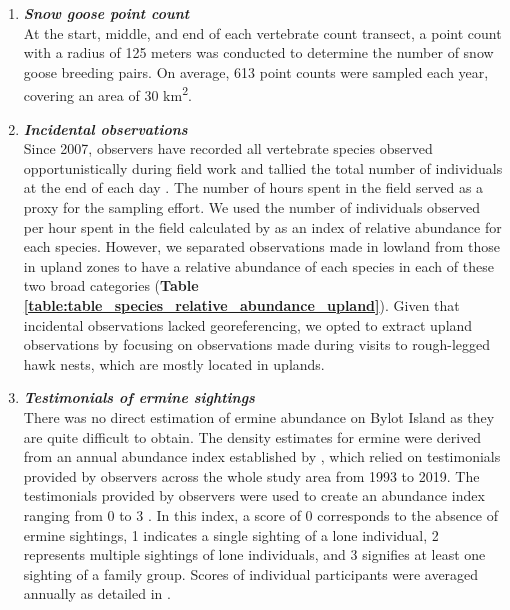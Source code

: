 \documentclass[a4paper,twoside,12pt]{article}
\begin{document}
\begin{enumerate}[label=\roman*]
\begin{figure}
\end{figure}
\newpage
\item[] \textit{\textbf{Snow goose point count}}\\
At the start, middle, and end of each vertebrate count transect, a point count with a radius of 125 meters was conducted to determine the number of snow goose breeding pairs. On average, 613  point counts were sampled each year, covering an area of 30  km\textsuperscript{2}.
\\
\item[] \textit{\textbf{Incidental observations}}\\
Since 2007, observers have recorded all vertebrate species observed opportunistically during field work and tallied the total number of individuals at the end of each day \citep{gauthier2020daily, gauthier2024a}. The number of hours spent in the field served as a proxy for the sampling effort. We used the number of individuals observed per hour spent in the field calculated by \citet{gauthier2024a} as an index of relative abundance for each species. However, we separated observations made in lowland from those in upland zones to have a relative abundance of each species in each of these two broad categories (\textbf{Table \ref{table:table_species_relative_abundance_upland}}). Given that incidental observations lacked georeferencing, we opted to extract upland observations by focusing on observations made during visits to rough-legged hawk nests, which are mostly located in uplands. \\

\newpage
\item[] \textit{\textbf{Testimonials of ermine sightings}}\\
There was no direct estimation of ermine abundance on Bylot Island as they are quite difficult to obtain. The density estimates for ermine were derived from an annual abundance index established by \citet{bolduc2023}, which relied on testimonials provided by observers across the whole study area from 1993 to 2019. The testimonials provided by observers were used to create an abundance index ranging from 0 to 3 \citep{bolduc2023}. In this index, a score of 0 corresponds to the absence of ermine sightings, 1 indicates a single sighting of a lone individual, 2 represents multiple sightings of lone individuals, and 3 signifies at least one sighting of a family group. Scores of individual participants were averaged annually as detailed in \citet{bolduc2023}. 
\end{enumerate}
\end{document}
